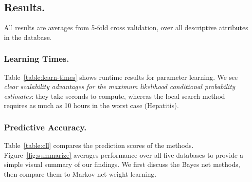 \documentclass[twoside,leqno,twocolumn]{article}
\begin{document}
\subsection{Results.}

All results are averages from 5-fold cross validation, over all descriptive attributes in the database. 

\subsubsection{Learning Times.}
Table~\ref{table:learn-times} shows runtime results for parameter learning. We see {\em clear scalability advantages for the maximum likelihood conditional probability estimates}: they take seconds to compute, whereas the local search method requires as much as 10 hours in the worst case (Hepatitis).

\begin{table}[htdp]
\caption{A comparison of {\em runtime} (seconds) required for parameter learning with a fixed Bayes net structure. The Bayes net methods use the observed conditional frequencies. The Markov net methods use Alchemy's default weight learning. Database sizes are specified by the number of tuples and the number of ground atoms. 
}
\begin{center}
\begin{large}
\end{large}
\end{center}
\label{table:learn-times}
\end{table}%
\subsubsection{Predictive Accuracy.} Table~\ref{table:cll} compares the prediction scores of the methods.
Figure~\ref{fig:summarize} averages performance over all five databases to provide a simple visual summary of our findings. 
We first discuss the Bayes net methods, then compare them to Markov net weight learning.
\end{document}
